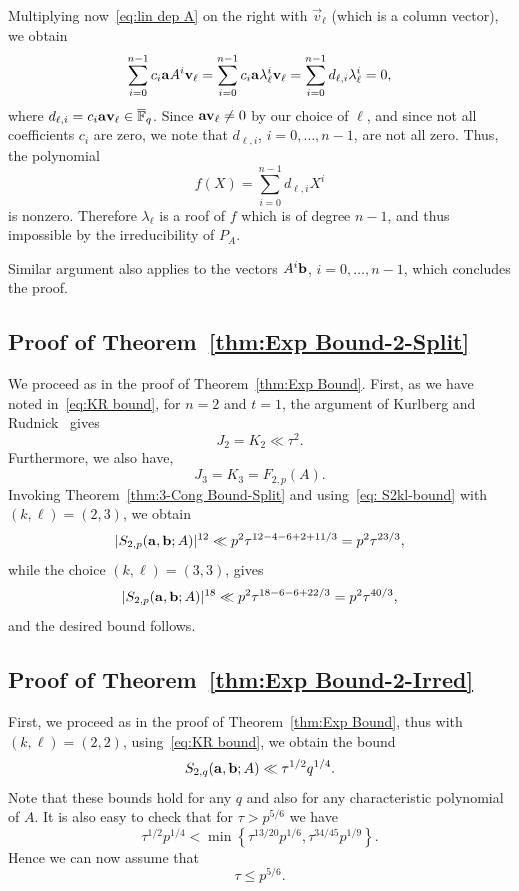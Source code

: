 \documentclass[12pt]{amsart}
\begin{document}
Multiplying now~\eqref{eq:lin dep A} on the right with $\vec{v}_\ell$ (which is a column vector), we obtain
$$
\sum_{i=0}^{n-1} c_i \mathbf{a} A^{i}\mathbf{v}_\ell=\sum_{i=0}^{n-1} c_i \mathbf{a} \lambda_\ell^{i}\mathbf{v}_\ell=\sum_{i=0}^{n-1} d_{\ell,i} \lambda_\ell^{i}=0,
$$
where $d_{\ell,i}=c_i\mathbf{a}\mathbf{v_\ell}\in\overline {{\mathbb F}}_q$. Since $\mathbf{a} \mathbf{v}_\ell\ne 0$ by our choice of $\ell$, and  since not all coefficients $c_i$ are zero, 
we note that $d_{\ell,i}$, $i=0,\ldots,n-1$, are not all zero. Thus, the polynomial 
$$
f(X)=\sum_{i=0}^{n-1}d_{\ell,i}X^i
$$ 
is nonzero. Therefore $\lambda_\ell$ is a roof of $f$ which is of degree $n-1$, and thus impossible  by the irreducibility of  $P_A$. 

Similar argument also applies to the vectors $ A^{i}\mathbf{b}$, $ i =0, \ldots, n-1$, 
which concludes the proof. 

\subsection{Proof of Theorem~\ref{thm:Exp Bound-2-Split}} We proceed as in the proof of Theorem~\ref{thm:Exp Bound}.  First, as we have noted in~\eqref{eq:KR bound},  for $n=2$ and $t=1$, the argument of Kurlberg and Rudnick~\cite{KR}  
gives 
$$
J_2 = K_2 \ll \tau^2. 
$$ 
Furthermore,  we also have, 
$$
J_3 = K_3 = F_{2,p}(A).
$$
Invoking  Theorem~\ref{thm:3-Cong Bound-Split} and using~\eqref{eq: S2kl-bound} 
with $(k,\ell) =(2,3)$, 
we obtain 
$$
|S_{2,p}(\mathbf{a}, \mathbf{b};A)|^{12}  \ll p^2 \tau^{12- 4 -6+ 2 +11/3} = p^2 \tau^{23/3} , 
$$ 
while  the choice  $(k,\ell) =(3,3)$,  gives
$$
|S_{2,p}(\mathbf{a}, \mathbf{b};A)|^{18}  \ll p^2 \tau^{18- 6 -6+22/3} = p^2 \tau^{40/3} , 
$$ 
and  the desired bound follows. 

\subsection{Proof of Theorem~\ref{thm:Exp Bound-2-Irred} }
First, we proceed as in the proof of Theorem~\ref{thm:Exp Bound}, thus 
with $(k,\ell) = (2,2)$, using~\eqref{eq:KR bound}, we obtain 
the bound
 $$
S_{2,q}(\mathbf{a}, \mathbf{b};A) \ll \tau^{1/2}q^{1/4}. 
$$ 
Note that these bounds hold for any $q$ and also for any characteristic 
polynomial of $A$. It is also easy to check that for $\tau > p^{5/6}$ 
we have 
$$
  \tau^{1/2} p^{1/4} < \min\left\{\tau^{13/20} p^{1/6}, \tau^{34/45}   p^{1/9} \right\}. 
$$
Hence we can now assume that 
 \begin{equation}
\label{eq: large tau}
\tau \le p^{5/6}. 
\end{equation}
\end{document}
